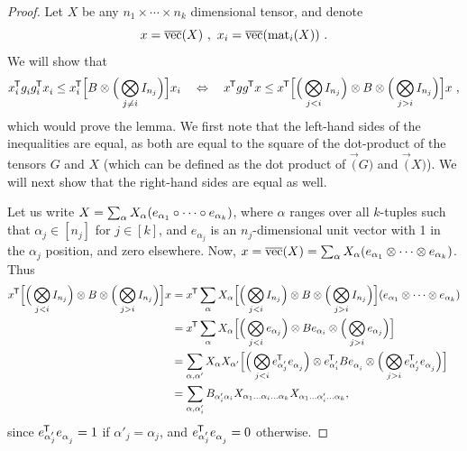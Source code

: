 \begin{proof}
Let $X$ be any $n_1 \times \cdots \times n_k$ dimensional tensor, and denote
$$x = \overline{\mathrm{vec}}(X) ~ , ~ x_i = \overline{\mathrm{vec}}(\mathrm{mat}_{i}(X)) ~. $$
We will show that
\begin{align*}
x_i^{\mkern-1.5mu\scriptstyle\mathsf{T}}  g_i^{}g_i^{\mkern-1.5mu\scriptstyle\mathsf{T}} x_i^{}
\le
x_i^{\mkern-1.5mu\scriptstyle\mathsf{T}} \mathopen{}\Big[ B \otimes \mathopen{}\Big( \bigotimes_{j\neq i} I_{n_j} \Big) \Big] x_i
~~~\Leftrightarrow~~~
x^{\mkern-1.5mu\scriptstyle\mathsf{T}} g g^{\mkern-1.5mu\scriptstyle\mathsf{T}} x
\le
x^{\mkern-1.5mu\scriptstyle\mathsf{T}} \mathopen{}\Big[\mathopen{}\Big( \bigotimes_{j<i} I_{n_j} \Big) \otimes B \otimes \mathopen{}\Big( \bigotimes_{j>i} I_{n_j} \Big)\Big] x
~,
\end{align*}
which would prove the lemma.
We first note that the left-hand sides of the inequalities are equal, as both are equal to the square of the dot-product of the tensors $G$ and $X$ (which can be defined as the dot product of $\vec(G)$ and $\vec(X)$).
We will next show that the right-hand sides are equal as well.

Let us write $X = \sum_\alpha X_\alpha (e_{\alpha_1} \circ \cdots \circ e_{\alpha_k})$, where
 $\alpha$ ranges over all
$k$-tuples such that $\alpha_j \in [n_j]$ for $j \in [k]$, and $e_{\alpha_j}$ is an $n_j$-dimensional
unit vector with 1 in the $\alpha_j$ position, and zero elsewhere.
%
Now, $x = \overline{\mathrm{vec}}(X) = \sum_\alpha X_\alpha (e_{\alpha_1} \otimes \cdots \otimes e_{\alpha_k})$.
Thus
\begin{align*}
x^{\mkern-1.5mu\scriptstyle\mathsf{T}} \mathopen{}\Big[\mathopen{}\Big( \bigotimes_{j<i} I_{n_j} \Big) \otimes B \otimes \mathopen{}\Big( \bigotimes_{j>i} I_{n_j} \Big)\Big] x
&=
x^{\mkern-1.5mu\scriptstyle\mathsf{T}} \sum_\alpha X_\alpha \mathopen{}\Big[\mathopen{}\Big( \bigotimes_{j<i} I_{n_j} \Big) \otimes B \otimes \mathopen{}\Big( \bigotimes_{j>i} I_{n_j} \Big)\Big] (e_{\alpha_1} \otimes \cdots \otimes e_{\alpha_k})
\\
&=
x^{\mkern-1.5mu\scriptstyle\mathsf{T}} \sum_\alpha X_\alpha \mathopen{}\Big[\mathopen{}\Big( \bigotimes_{j<i} e_{\alpha_j} \Big) \otimes B e_{\alpha_i} \otimes \mathopen{}\Big( \bigotimes_{j>i} e_{\alpha_j} \Big)\Big]
\\
&=
\sum_{\alpha, \alpha'} X_\alpha X_{\alpha'}
\mathopen{}\Big[\mathopen{}\Big( \bigotimes_{j<i} e_{\smash{\alpha'_j}}^{\mkern-1.5mu\scriptstyle\mathsf{T}} e_{\smash{\alpha_j^{}}}^{} \Big) \otimes e_{\smash{\alpha'_i}}^{\mkern-1.5mu\scriptstyle\mathsf{T}} B e^{}_{\alpha_i^{}} \otimes \mathopen{}\Big( \bigotimes_{j>i} e_{\smash{\alpha'_j}}^{\mkern-1.5mu\scriptstyle\mathsf{T}} e^{}_{\alpha_j^{}} \Big)\Big]
\\
&=
\sum_{\alpha, \alpha'_i} B_{\alpha'_i\alpha_i} X_{\alpha_1\ldots \alpha_i\ldots \alpha_k}  X_{\alpha_1\ldots \alpha'_i\ldots \alpha_k}
,
\end{align*}
since $e_{\smash{\alpha'_j}}^{\mkern-1.5mu\scriptstyle\mathsf{T}} e^{}_{\alpha_j^{}} = 1$ if $\alpha'_j = \alpha_j$, and $e_{\smash{\alpha'_j}}^{\mkern-1.5mu\scriptstyle\mathsf{T}} e^{}_{\alpha_j^{}} =  0$ otherwise.


\end{proof}
